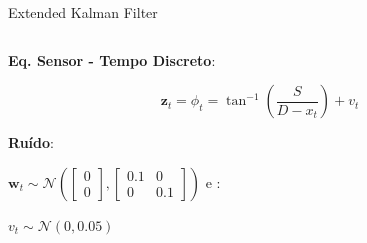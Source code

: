 \documentclass[aspectratio=169]{beamer}
\begin{document}
\begin{frame}[c]{Extended Kalman Filter}
\begin{columns}
\begin{column}[c]{0.6\textwidth}
            \textbf{Eq. Sensor - Tempo Discreto}:

            \begin{equation*}
                \mathbf{z}_t = \phi_t  = 
                \tan^{-1}\left(\frac{S}{D-x_t} \right) +
                v_{t}
            \end{equation*}            

            \textbf{Ruído}:

            $\mathbf{w}_t \sim \mathcal{N} 
                \left(
                    \begin{bmatrix}
                    0 \\ 0    
                    \end{bmatrix},
                    \begin{bmatrix}
                    0.1 & 0 \\
                    0   & 0.1
                \end{bmatrix}
                \right)$ e :
            
            $ v_t \sim \mathcal{N} (0,0.05)$

        \end{column}
    \end{columns}
\end{frame}
\end{document}

